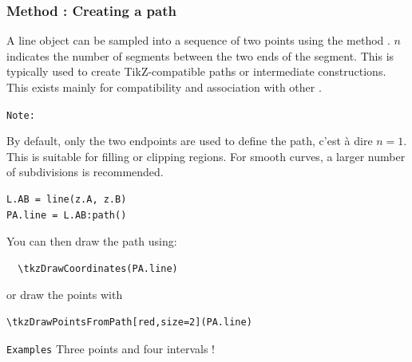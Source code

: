 \subsubsection{Method : Creating a path}
\label{ssub:line_path}

A line object can be sampled into a sequence of two points using the method . $n$ indicates the number of segments between the two ends of the segment. This is typically used to create TikZ-compatible paths or intermediate constructions. This 
exists mainly for compatibility and association with other .
\medskip

\texttt{Note: }

By default, only the two endpoints are used to define the path, c'est à dire $n = 1$. This is suitable for filling or clipping regions. For smooth curves, a larger number of subdivisions is recommended.

\medskip

\begin{mybox}
\begin{verbatim}
L.AB = line(z.A, z.B)
PA.line = L.AB:path()
\end{verbatim}
\end{mybox}

You can then draw the path using:

\begin{mybox}
\begin{verbatim}
  \tkzDrawCoordinates(PA.line)
\end{verbatim}
\end{mybox}

or draw the points with

\begin{mybox}
\begin{verbatim}
\tkzDrawPointsFromPath[red,size=2](PA.line)
\end{verbatim}
\end{mybox}

\texttt{Examples}
Three points and four intervals !

\begin{tkzexample}[latex = .5\textwidth]
\end{tkzexample}

